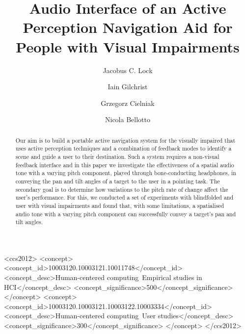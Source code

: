 \documentclass[sigconf, screen=true, anonymous=true]{acmart}
\begin{document}
\title{Audio Interface of an Active Perception Navigation Aid for People with Visual Impairments}

\author{Jacobus C. Lock}

\author{Iain Gilchrist}

\author{Grzegorz Cielniak}

\author{Nicola Bellotto}

\begin{abstract}
	Our aim is to build a portable active navigation system for the visually impaired that uses active perception techniques and a combination of feedback modes to identify a scene and guide a user to their destination.
	Such a system requires a non-visual feedback interface and in this paper we investigate the effectiveness of a spatial audio tone with a varying pitch component, played through bone-conducting headphones, in conveying the pan and tilt angles of a target to the user in a pointing task.
	The secondary goal is to determine how variations to the pitch rate of change affect the user's performance.
	For this, we conducted a set of experiments with blindfolded and user with visual impairments and found that, with some limitations, a spatialised audio tone with a varying pitch component can successfully convey a target's pan and tilt angles. 
\end{abstract} 
 \begin{CCSXML}
<ccs2012>
<concept>
<concept_id>10003120.10003121.10011748</concept_id>
<concept_desc>Human-centered computing~Empirical studies in HCI</concept_desc>
<concept_significance>500</concept_significance>
</concept>
<concept>
<concept_id>10003120.10003121.10003122.10003334</concept_id>
<concept_desc>Human-centered computing~User studies</concept_desc>
<concept_significance>300</concept_significance>
</concept>
</ccs2012>
\end{CCSXML}
\end{document}

